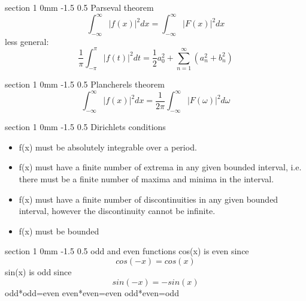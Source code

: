 \documentclass[a4paper,11pt]{article}
\makeatletter
\renewcommand{\section}{\@startsection
   {section}%
   {1}%
   {0mm}%
   {-1.5\baselineskip}%
   {0.5\baselineskip}%
   {\sffamily\bfseries\upshape\normalsize}}%
\makeatother
\begin{document}
\section{Parseval theorem}
$$\int_{-\infty}^{\infty}|f(x)|^2dx=\int_{-\infty}^{\infty}|F(x)|^2dx$$
less general:
$$\dfrac{1}{\pi}\int_{-\pi}^{\pi}|f(t)|^2dt=\dfrac{1}{2}a_0^2+\sum_{n=1}^{\infty}(a_n^2+b_n^2)$$

\section{Plancherels theorem}
$$\int_{-\infty}^{\infty}|f(x)|^2dx=\dfrac{1}{2\pi}\int_{-\infty}^{\infty}|F(\omega)|^2d\omega$$

\section{Dirichlets conditions}
\begin{itemize}
    \item f(x) must be absolutely integrable over a period.\newline
    \item f(x) must have a finite number of extrema in any given bounded interval, i.e. there must be a finite number of maxima and minima in the interval.\newline
    \item f(x) must have a finite number of discontinuities in any given bounded interval, however the discontinuity cannot be infinite.\newline
    \item f(x) must be bounded
\end{itemize}

\section{odd and even functions}
cos(x) is even since
$$cos(-x)=cos(x)$$
sin(x) is odd since
$$sin(-x)=-sin(x)$$
odd*odd=even \newline
even*even=even \newline
odd*even=odd\newline
\end{document}
